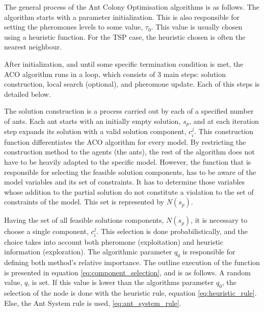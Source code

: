 


The general process of the Ant Colony Optimisation algorithms is as follows.
The algorithm starts with a parameter initialization. This is also responsible
for setting the pheromones levels to some value, $\tau_{0}$.
This value is usually
chosen using a heuristic function. For the TSP case, the heuristic chosen is often
the nearest neighbour.

After initialization, and until some specific termination condition is met,
the ACO algorithm runs in a loop, which consists of 3 main steps:
solution construction, local search (optional), and pheromone update.
Each of this steps is detailed below.

The solution construction is a process carried out by each of a specified number of ants.
Each ant starts with an initially empty solution, $s_{p}$, and at each iteration step
expands its solution with a valid solution component, $c_{i}^{j}$. This construction function
differentiates the ACO algorithm for every model.
By restricting the construction method to the agents (the ants), the rest
of the algorithm does not have to be heavily adapted to the specific model.
However, the function that is responsible for selecting the feasible solution components,
has to be aware of the model variables and its set of constraints. It has to
determine those variables whose addition to the partial solution do not
constitute a violation to the set of constraints of the model. This set is represented
by $N(s_{p})$.

Having the set of all feasible solutions components, $N(s_{p})$,
it is necessary to choose a single component, $c_{i}^{j}$. This selection is done probabilistically,
and the choice takes into account both pheromone (exploitation) and heuristic information (exploration).
The algorithmic parameter $q_{0}$ is responsible
for defining both method's relative importance. The outline execution of the function
is presented in equation \ref{eq:component_selection}, and is as follows.
A random value, $q$, is set. If this value is lower than the algorithms
parameter $q_{0}$, the selection of the node is done with the heuristic rule,
equation \ref{eq:heuristic_rule}. Else, the Ant System rule is used, \ref{eq:ant_system_rule}.

